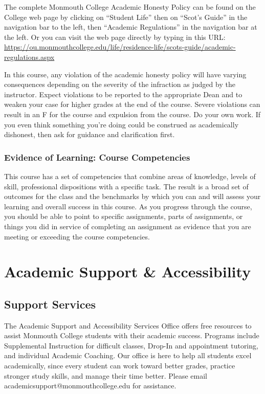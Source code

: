 \documentclass[10pt]{article}
\begin{document}
The complete Monmouth College Academic Honesty Policy can be found on the College web page by clicking on ``Student Life'' then on ``Scot’s Guide'' in the navigation bar to the left, then ``Academic Regulations'' in the navigation bar at the left.  Or you can visit the web page directly by typing in this URL: \url{https://ou.monmouthcollege.edu/life/residence-life/scots-guide/academic-regulations.aspx}

In this course, any violation of the academic honesty policy will have varying consequences depending on the severity of the infraction as judged by the instructor.  Expect violations to be reported to the appropriate Dean and to weaken your case for higher grades at the end of the course. Severe violations can result in an F for the course and expulsion from the course. Do your own work. If you even think something you're doing could be construed as academically dishonest, then ask for guidance and clarification first.

\subsubsection*{Evidence of Learning: Course Competencies}

This course has a set of competencies that combine areas of knowledge, levels of skill, professional dispositions with a specific task. The result is a broad set of outcomes for the class and the benchmarks by which you can and will assess your learning and overall success in this course. As you progress through the course, you should be able to point to specific assignments, parts of assignments, or things you did in service of completing an assignment as evidence that you are meeting or exceeding the course competencies.


\section{Academic Support \& Accessibility}

\subsection*{Support Services}
The Academic Support and Accessibility Services Office offers free resources to assist Monmouth College students with their academic success. Programs include Supplemental Instruction for difficult classes, Drop-In and appointment tutoring, and individual Academic Coaching. Our office is here to help all students excel academically, since every student can work toward better grades, practice stronger study skills, and manage their time better. Please email academicsupport@monmouthcollege.edu for assistance.
\end{document}
